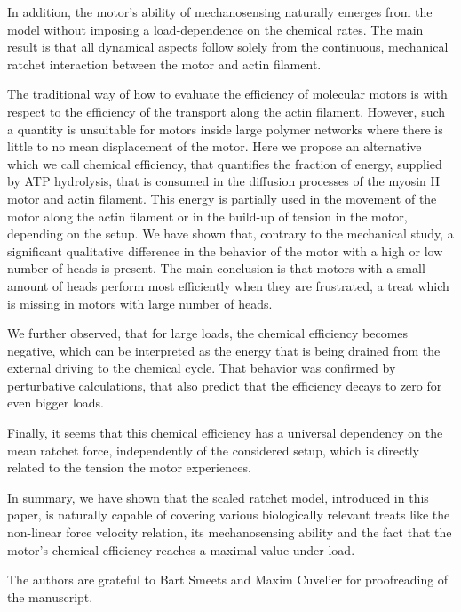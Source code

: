 \documentclass[aps,pre,twocolumn,showpacs,showkeys,superscriptaddress,floatfix]{revtex4-1}
\begin{document}
In addition, the motor's ability of mechanosensing naturally emerges from the model without imposing a load-dependence on the chemical rates.
The main result is that all dynamical aspects follow solely from the continuous, mechanical ratchet interaction between the motor and actin filament.

The traditional way of how to evaluate the efficiency of molecular motors is with respect to the efficiency of the transport along the actin filament.
However, such a quantity is unsuitable for motors inside large polymer networks where there is little to no mean displacement of the motor. 
Here we propose an alternative which we call chemical efficiency, that quantifies the fraction of energy, supplied by ATP hydrolysis, 
that is consumed in the diffusion processes of the myosin II motor and actin filament.
This energy is partially used in the movement of the motor along the actin filament or in the build-up of tension in the motor, depending on the setup. 
We have shown that, contrary to the mechanical study, a significant qualitative difference in the behavior of the motor with a high or low number of heads is present. 
The main conclusion is that motors with a small amount of heads perform most efficiently when they are frustrated, a treat which is missing in motors with large number of heads.

We further observed, that for large loads, the chemical efficiency becomes negative, 
which can be interpreted as the energy that is being drained from the external driving to the chemical cycle.
That behavior was confirmed by perturbative calculations, that also predict that the efficiency decays to zero for even bigger loads.

Finally, it seems that this chemical efficiency has a universal dependency on the mean ratchet force, independently of the considered setup,
which is directly related to the tension the motor experiences. 

In summary, we have shown that the scaled ratchet model, introduced in this paper, is naturally capable of covering various biologically relevant treats like the non-linear force velocity relation,  its mechanosensing ability and the fact that the motor's chemical efficiency reaches a maximal value under load. 

\begin{acknowledgments}
The authors are grateful 
to Bart Smeets and Maxim Cuvelier for proofreading of the manuscript.
\end{acknowledgments}
\end{document}
